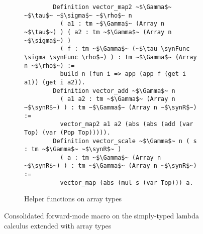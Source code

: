 \begin{figure}
\begin{subfigure}{1\textwidth}
\begin{verbatim}
        Definition vector_map2 ~$\Gamma$~ ~$\tau$~ ~$\sigma$~ ~$\rho$~ n
          ( a1 : tm ~$\Gamma$~ (Array n ~$\tau$~) ) ( a2 : tm ~$\Gamma$~ (Array n ~$\sigma$~) )
          ( f : tm ~$\Gamma$~ (~$\tau \synFunc \sigma \synFunc \rho$~) ) : tm ~$\Gamma$~ (Array n ~$\rho$~) :=
          build n (fun i => app (app f (get i a1)) (get i a2)).
        Definition vector_add ~$\Gamma$~ n
          ( a1 a2 : tm ~$\Gamma$~ (Array n ~$\synR$~) ) : tm ~$\Gamma$~ (Array n ~$\synR$~) :=
          vector_map2 a1 a2 (abs (abs (add (var Top) (var (Pop Top))))).
        Definition vector_scale ~$\Gamma$~ n ( s : tm ~$\Gamma$~ ~$\synR$~ )
          ( a : tm ~$\Gamma$~ (Array n ~$\synR$~) ) : tm ~$\Gamma$~ (Array n ~$\synR$~) :=
          vector_map (abs (mul s (var Top))) a.
      \end{verbatim}
      \caption{Helper functions on array types}
    \end{subfigure}
    \caption{Consolidated forward-mode macro on the simply-typed lambda calculus extended with array types}
    \label{fig:forward_mode_cont}
  \end{figure}

